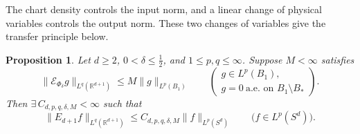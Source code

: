 \documentclass[11pt]{article}
\numberwithin{equation}{section}
\newtheorem{proposition}[theorem]{Proposition}
\newcommand{\R}{\mathbb{R}}
\newcommand{\norm}[1]{\lVert #1\rVert}
\begin{document}
The chart density controls the input norm, and a linear change of
physical variables controls the output norm. These two changes of
variables give the transfer principle below.

\begin{proposition}\label{cap:transfer}
Let \(d\ge2\), \(0<\delta\le\tfrac12\), and \(1\le p,q\le\infty\).
Suppose \(M<\infty\) satisfies
\begin{equation}\label{cap:graph-hypothesis}
 \norm{\mathcal E_{\Phi_\delta}g}_{L^q(\R^{d+1})}
 \le M\norm{g}_{L^p(B_1)}
 \qquad
 \left(
 \begin{gathered}
  g\in L^p(B_1),\\[-2pt]
  g=0\ \text{a.e.\ on }B_1\setminus B_*
 \end{gathered}
 \right).
\end{equation}
Then \(\exists\,C_{d,p,q,\delta,M}<\infty\) such that
\[
 \norm{E_{d+1}f}_{L^q(\R^{d+1})}
 \le C_{d,p,q,\delta,M}\norm f_{L^p(S^d)}
 \qquad \bigl(f\in L^p(S^d)\bigr).
\]
\end{proposition}
\end{document}
